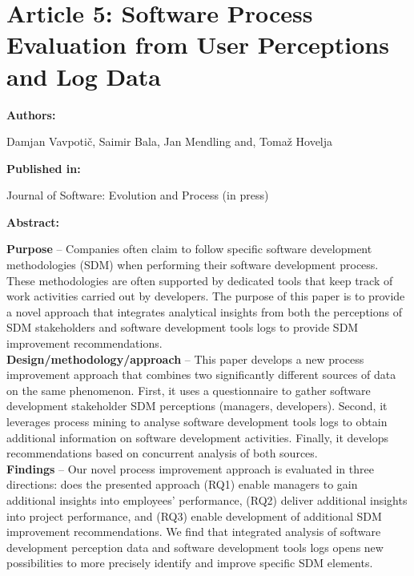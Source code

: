 
\chapter{Article 5: Software Process Evaluation from User Perceptions and Log Data}


{\bfseries \Large Authors: \medskip}

Damjan Vavpotič,
Saimir Bala,
Jan Mendling and,
Tomaž Hovelja \hfill

\bigskip

{\noindent\bfseries \Large Published in: \medskip}

Journal of Software: Evolution and Process (in press)

\bigskip

{\noindent\bfseries \Large Abstract: \medskip}


\noindent \textbf{Purpose} – Companies often claim to follow specific software development methodologies (SDM) when performing their software development process. These methodologies are often supported by dedicated tools that keep track of work activities carried out by developers. The purpose of this paper is to provide a novel approach that integrates analytical insights from both the perceptions of SDM stakeholders and software development tools logs to provide SDM improvement recommendations. \\

\noindent
\textbf{Design/methodology/approach} – This paper develops a new process improvement approach that combines two significantly different sources of data on the same phenomenon. First, it uses a questionnaire to gather software development stakeholder SDM perceptions (managers, developers). Second, it leverages process mining to analyse software development tools logs to obtain additional information on software development activities. Finally, it develops recommendations based on concurrent analysis of both sources. \\

\noindent
\textbf{Findings} – Our novel process improvement approach is evaluated in three directions: does the presented approach (RQ1) enable managers to gain additional insights into employees’ performance, (RQ2) deliver additional insights into project performance, and (RQ3) enable development of additional SDM improvement recommendations. We find that integrated analysis of software development perception data and software development tools logs opens new possibilities to more precisely identify and improve specific SDM elements.\\

